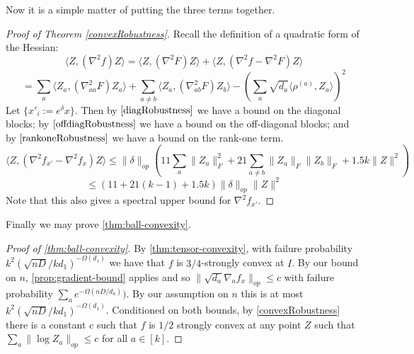 \documentclass[aos]{imsart}
\theoremstyle{definition}
\numberwithin{equation}{section}
\newcommand{\samp}{x}
\newcommand{\CF}[1]{{\color{purple}[CF: #1]}}
\newcommand{\AR}[1]{{\color{orange}[AR: #1]}}
\begin{document}
\begin{appendix}
Now it is a simple matter of putting the three terms together.

\begin{proof} [Proof of Theorem \cref{convexRobustness}]
Recall the definition of a quadratic form of the Hessian:
\[ \langle Z, (\nabla^{2} f) Z \rangle = \langle Z, (\nabla^{2} F) Z \rangle + \langle Z, (\nabla^{2} f - \nabla^{2} F) Z \rangle     \]
\[ = \sum_{a} \langle Z_{a}, (\nabla^{2}_{aa} F) Z_{a} \rangle + \sum_{a \neq b} \langle Z_{a}, (\nabla^{2}_{ab} F) Z_{b} \rangle - \left( \sum_{a} \sqrt{d_{a}} \langle \rho^{(a)}, Z_{a} \rangle  \right)^{2}       \]
Let $\{\samp'_{i} := e^{\delta} \samp\}$. Then by $\cref{diagRobustness}$ we have a bound on the diagonal blocks; by $\cref{offdiagRobustness}$ we have a bound on the off-diagonal blocks; and by $\cref{rankoneRobustness}$ we have a bound on the rank-one term.
\[ \langle Z, (\nabla^2 f_{\samp'} - \nabla^{2} f_{\samp}) Z \rangle \leq \|\delta\|_{op} \left( 11 \sum_{a} \|Z_{a}\|_{F}^{2} + 21 \sum_{a \neq b} \|Z_{a}\|_{F} \|Z_{b}\|_{F} + 1.5 k \|Z\|^{2} \right)   \]
\[ \leq (11 + 21(k-1) + 1.5 k) \|\delta\|_{op} \|Z\|^{2}    \]
Note that this also gives a spectral upper bound for $\nabla^{2} f_{\samp'}$.
\end{proof}

Finally we may prove \cref{thm:ball-convexity}.
\begin{proof}[Proof of \cref{thm:ball-convexity}]
By \cref{thm:tensor-convexity}, with failure probability $k^2 ({\sqrt{nD}}/{kd_1})^{ - \Omega(d_1)}$ we have that $f$ is $3/4$-strongly convex at $I$. By our bound on $n$,  \cref{prop:gradient-bound} applies and so $\|\sqrt{d_{a}} \nabla_{a} f_{\samp}\|_{op} \leq c$ with failure probability $\sum_a e^{ - \Omega(nD/d_a)})$. By our assumption on $n$ this is at most $k^2 ({\sqrt{nD}}/{kd_1})^{ - \Omega(d_1)}$. Conditioned on both bounds, by \cref{convexRobustness} there is a constant $c$ such that $f$ is $1/2$ strongly convex at any point $Z$ such that $\sum_a \|\log Z_a\|_{op} \leq  c$ for all $a \in [k]$. \end{proof}










\end{appendix}
\end{document}
